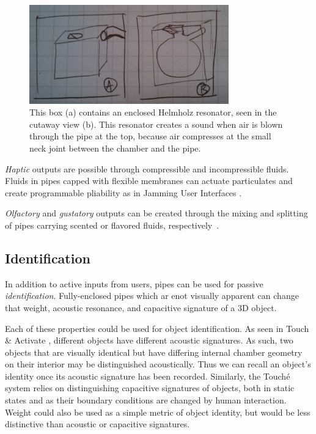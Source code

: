 \begin{figure}[h]
\centering
    \includegraphics[width=3.4in]{figures/placeholder/helmholz.jpg}
\caption{This box (a) contains an enclosed Helmholz resonator, seen in the cutaway view (b).  This resonator creates a sound when air is blown through the pipe at the top, because air compresses at the small neck joint between the chamber and the pipe.  }
\label{fig:ocarina}
\end{figure}

\emph{Haptic} outputs are possible through compressible and incompressible fluids.  Fluids in pipes capped with flexible membranes can actuate particulates and create programmable pliability as in Jamming User Interfaces \cite{Follmer-jamming}. 

\emph{Olfactory} and \emph{gustatory} outputs can be created through the mixing and splitting of pipes carrying scented or flavored fluids, respectively~\cite{kaye2004making}.

\subsection{Identification}
In addition to active inputs from users, pipes can be used for passive \emph{identification}.  Fully-enclosed pipes which ar enot visually apparent can change that weight, acoustic resonance, and capacitive signature of a 3D object. 

Each of these properties could be used for object identification. As seen in Touch \& Activate \cite{Ono-touchandactivate}, different objects have different acoustic signatures.  As such, two objects that are visually identical but have differing internal chamber geometry on their interior may be distinguished acoustically.  Thus we can recall an object's identity once its acoustic signature has been recorded.  Similarly, the Touch\'{e} system \cite{Sato-touche} relies on distinguishing capacitive signatures of objects, both in static states and as their boundary conditions are changed by human interaction. Weight could also be used as a simple metric of object identity, but would be less distinctive than acoustic or capacitive signatures.

